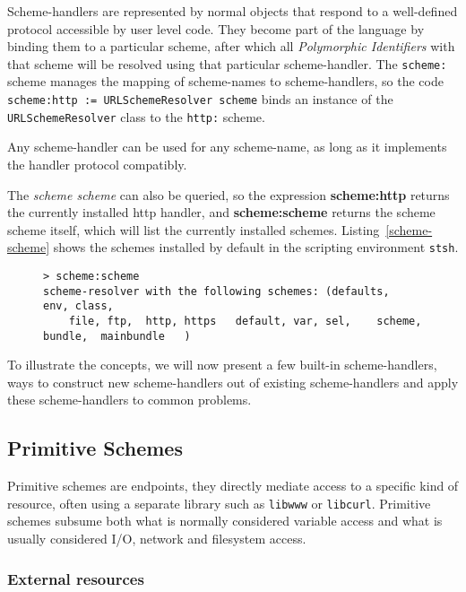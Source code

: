 \documentclass[preprint,authoryear]{llncs}
\begin{document}
Scheme-handlers are represented by normal objects that respond to a well-defined protocol 
accessible by user level code.  They
become part of the language by binding them to a particular scheme, after which
all \emph{Polymorphic Identifiers} with that scheme will be resolved using that particular scheme-handler.
The {\tt scheme:} scheme manages the mapping of scheme-names to scheme-handlers, so the code 
{\tt scheme:http := URLSchemeResolver scheme} binds an instance of the {\tt URLSchemeResolver} class
to the {\tt http:} scheme.

 Any scheme-handler
can be used for any scheme-name, as long as it implements the handler protocol
compatibly.


The \emph{scheme scheme} can also be queried,
so the expression {\bf scheme:http} returns the currently installed http handler, and 
{\bf scheme:scheme} returns the scheme scheme itself, which will list the currently
installed schemes.  Listing~\ref{scheme-scheme} shows the schemes installed by
default in the scripting environment {\tt stsh}.

\begin{figure}[htbp]
\begin{lstlisting}[style=L,label=scheme-scheme,caption=List of schemes via scheme:scheme.]
> scheme:scheme 
scheme-resolver with the following schemes: (defaults,  env, class,
    file, ftp,  http, https   default, var, sel,    scheme,    bundle,  mainbundle   )
\end{lstlisting}
\end{figure}

To illustrate the concepts, we will now present a few built-in scheme-handlers, ways to construct new
scheme-handlers out of existing scheme-handlers and apply these scheme-handlers to common
problems.

\subsection{Primitive Schemes}
\label{primitiveSchemes}

Primitive schemes are endpoints, they directly
mediate access to a specific kind of resource, often using a separate
library such as {\tt libwww} or {\tt libcurl}.  Primitive schemes
subsume both what is normally considered variable access and 
what is usually considered I/O, network and filesystem access.


\subsubsection{External resources}
\label{externalResources}
\end{document}
